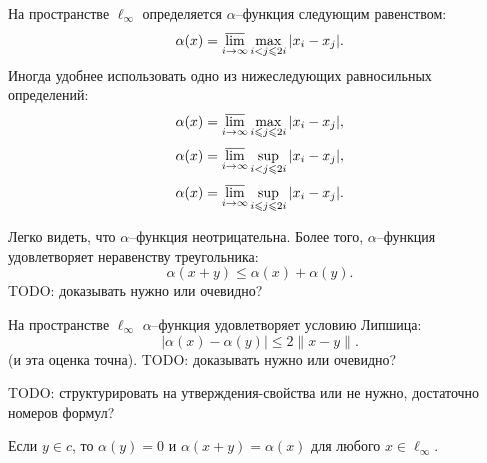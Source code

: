 На пространстве $\ell_\infty$ определяется $\alpha$--функция следующим равенством:
\begin{equation}
	\alpha(x) = \varlimsup_{i\to\infty} \max_{i<j\leqslant 2i} |x_i - x_j|
	.
\end{equation}
Иногда удобнее использовать одно из нижеследующих равносильных определений:
\begin{equation}
	\alpha(x) = \varlimsup_{i\to\infty} \max_{i \leqslant j\leqslant 2i} |x_i - x_j|
	,
\end{equation}
\begin{equation}
	\alpha(x) = \varlimsup_{i\to\infty} \sup_{i<j\leqslant 2i} |x_i - x_j|
	,
\end{equation}
\begin{equation}
	\alpha(x) = \varlimsup_{i\to\infty} \sup_{i \leqslant j\leqslant 2i} |x_i - x_j|
	.
\end{equation}

Легко видеть, что $\alpha$--функция неотрицательна.
Более того, $\alpha$--функция удовлетворяет неравенству треугольника:
\begin{equation}
	\alpha(x+y) \leq \alpha(x) + \alpha(y)
	.
\end{equation}
TODO: доказывать нужно или очевидно?

На пространстве $\ell_\infty$ $\alpha$--функция удовлетворяет условию Липшица:
\begin{equation}
	|\alpha(x) - \alpha(y)| \leq 2 \|x-y\|
	.
\end{equation}
(и эта оценка точна).
TODO: доказывать нужно или очевидно?

TODO: структурировать на утверждения-свойства или не нужно, достаточно номеров формул?

Если $y\in c$, то $\alpha(y) = 0$ и $\alpha(x+y) = \alpha(x)$ для любого $x \in \ell_\infty$.

